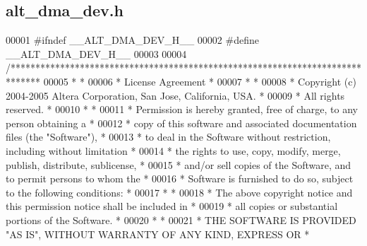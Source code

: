 \subsection{alt\+\_\+dma\+\_\+dev.\+h}
\label{alt__dma__dev_8h_source}

\begin{DoxyCode}
00001 \textcolor{preprocessor}{#ifndef \_\_ALT\_DMA\_DEV\_H\_\_}
00002 \textcolor{preprocessor}{#define \_\_ALT\_DMA\_DEV\_H\_\_}
00003 
00004 \textcolor{comment}{/******************************************************************************}
00005 \textcolor{comment}{*                                                                             *}
00006 \textcolor{comment}{* License Agreement                                                           *}
00007 \textcolor{comment}{*                                                                             *}
00008 \textcolor{comment}{* Copyright (c) 2004-2005 Altera Corporation, San Jose, California, USA.      *}
00009 \textcolor{comment}{* All rights reserved.                                                        *}
00010 \textcolor{comment}{*                                                                             *}
00011 \textcolor{comment}{* Permission is hereby granted, free of charge, to any person obtaining a     *}
00012 \textcolor{comment}{* copy of this software and associated documentation files (the "Software"),  *}
00013 \textcolor{comment}{* to deal in the Software without restriction, including without limitation   *}
00014 \textcolor{comment}{* the rights to use, copy, modify, merge, publish, distribute, sublicense,    *}
00015 \textcolor{comment}{* and/or sell copies of the Software, and to permit persons to whom the       *}
00016 \textcolor{comment}{* Software is furnished to do so, subject to the following conditions:        *}
00017 \textcolor{comment}{*                                                                             *}
00018 \textcolor{comment}{* The above copyright notice and this permission notice shall be included in  *}
00019 \textcolor{comment}{* all copies or substantial portions of the Software.                         *}
00020 \textcolor{comment}{*                                                                             *}
00021 \textcolor{comment}{* THE SOFTWARE IS PROVIDED "AS IS", WITHOUT WARRANTY OF ANY KIND, EXPRESS OR  *}

\end{DoxyCode}
